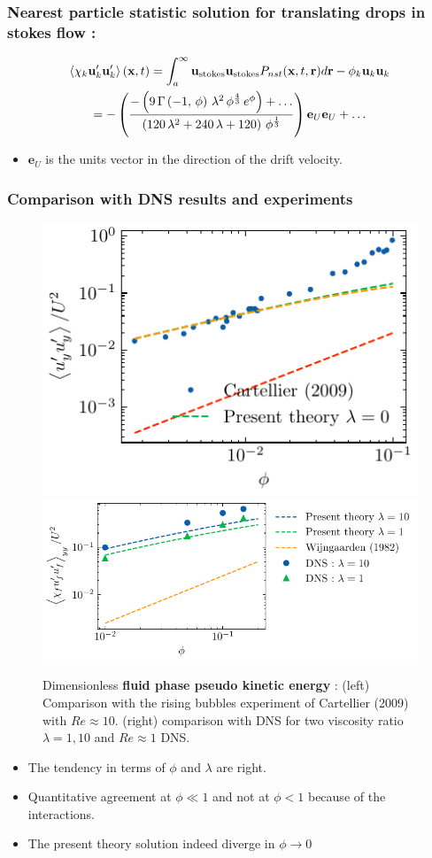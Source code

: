 \documentclass{sintefbeamer}
\begin{document}
\begin{frame}
  \frametitle{Nearest particle statistic solution for translating drops in stokes flow :}
  \begin{multline}
    \left<\chi_k \textbf{u}'_k\textbf{u}'_k\right>(\textbf{x},t)
    = 
    {\int_a^\infty \textbf{u}_\text{stokes} \textbf{u}_\text{stokes}  P_{nst}(\textbf{x},t,\textbf{r}) d\textbf{r} }
    - \phi_k \textbf{u}_k\textbf{u}_k
    \\=
-\left({{-\left(9\,\Gamma\left(-1 , \,\phi\right)\,\lambda^2\,\phi
^{{{4}\over{3}}}\,e^{\phi}\right)+\ldots}\over{\left(120\,\lambda^2+240\,\lambda+
120\right)\,\phi^{{{1}\over{3}}}}}\right)
\textbf{e}_U\textbf{e}_U + \ldots
\end{multline}
\begin{itemize}
  \item $\textbf{e}_U$ is the units vector in the direction of the drift velocity. 
\end{itemize}

\end{frame}

\begin{frame}
  \frametitle{Comparison with DNS results and experiments}
  \begin{figure}[h!]
    \centering    
    \includegraphics[height = 0.25\textwidth]{image/HOMOGENEOUS/fCA/cartellier.pdf}
    \includegraphics[height = 0.25\textwidth]{image/HOMOGENEOUS/fCA/Pseudo_turbe.pdf}
    \caption{
       Dimensionless \textbf{fluid phase pseudo kinetic energy} :
       (left) Comparison with the rising bubbles experiment of Cartellier (2009) with $Re \approx 10$. 
       (right) comparison with DNS for two viscosity ratio $\lambda =1,10$ and $Re \approx 1$ DNS. 
    }
    \label{fig:Cp}
\end{figure}  
\begin{itemize}
  \item The tendency in terms of $\phi$ and $\lambda$ are right.  
  \item Quantitative agreement at $\phi \ll 1$ and not at $\phi <1$ because of the interactions.  
  \item The present theory solution indeed diverge in $\phi \to 0$ 
\end{itemize}
\end{frame}
\end{document}
